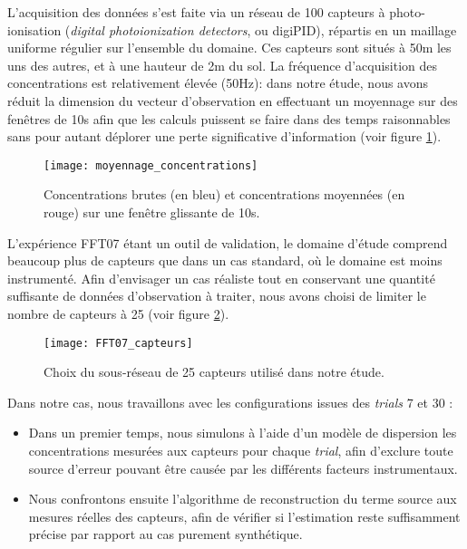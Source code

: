 L'acquisition des données s'est faite via un réseau de 100 capteurs à photo-ionisation (\textit{digital photoionization detectors}, ou digiPID), répartis en un maillage uniforme régulier sur l'ensemble du domaine. Ces capteurs sont situés à 50m les uns des autres, et à une hauteur de 2m du sol. La fréquence d'acquisition des concentrations est relativement élevée (50Hz): dans notre étude, nous avons réduit la dimension du vecteur d'observation en effectuant un moyennage sur des fenêtres de 10s afin que les calculs puissent se faire dans des temps raisonnables sans pour autant déplorer une perte significative d'information (voir figure \ref{fig_AE_3}).

\begin{figure}[h!]
	\centering
	\texttt{[image: moyennage\_concentrations]}
	\caption{Concentrations brutes (en bleu) et concentrations moyennées (en rouge) sur une fenêtre glissante de 10s. }
	\label{fig_AE_3}
\end{figure}


L'expérience FFT07 étant un outil de validation, le domaine d'étude comprend beaucoup plus de capteurs que dans un cas standard, où le domaine est moins instrumenté. Afin d'envisager un cas réaliste tout en conservant une quantité suffisante de données d'observation à traiter, nous avons choisi de limiter le nombre de capteurs  à 25 (voir figure \ref{fig_AE_4}).

\begin{figure}[h!]
	\centering
	\texttt{[image: FFT07\_capteurs]}
	\caption{Choix du sous-réseau de 25 capteurs utilisé dans notre étude.}
	\label{fig_AE_4}
\end{figure}

Dans notre cas, nous travaillons avec les configurations issues des \textit{trials} 7 et 30 : 
\begin{itemize}
	\item Dans un premier temps, nous simulons à l'aide d'un modèle de dispersion les concentrations mesurées aux capteurs pour chaque \textit{trial}, afin d'exclure toute source d'erreur pouvant être causée par les différents facteurs instrumentaux.
	\item Nous confrontons ensuite l'algorithme de reconstruction du terme source aux mesures réelles des capteurs, afin de vérifier si l'estimation reste suffisamment précise par rapport au cas purement synthétique.
\end{itemize}



